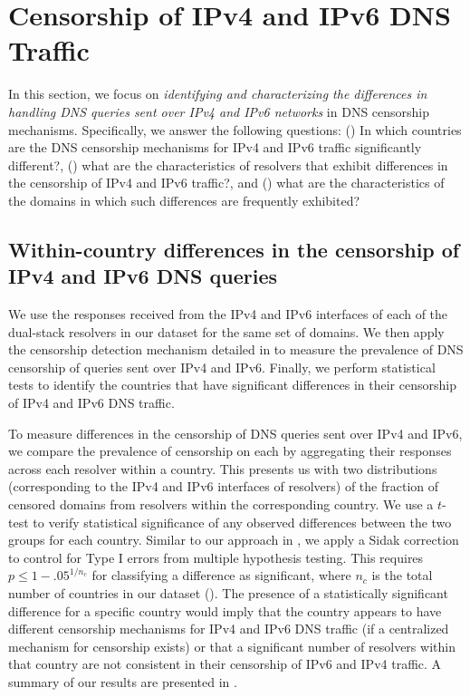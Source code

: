 \section{Censorship of IPv4 and IPv6 DNS Traffic}
\label{sec:infrastructure}

 In this section, we focus on {\it identifying and
characterizing the differences in handling DNS queries sent over IPv4 and IPv6
networks} in DNS censorship mechanisms. 
%
Specifically, we answer the following questions:
%
() In which countries are the DNS censorship
mechanisms for IPv4 and IPv6 traffic significantly different?,
%
() what are the characteristics of resolvers
that exhibit differences in the censorship of IPv4 and IPv6 traffic?, and
%
() what are the characteristics of the domains
in which such differences are frequently exhibited?

\subsection{Within-country differences in the censorship of IPv4 and IPv6 DNS
queries} \label{sec:infrastructure:country}

We use the responses received from the IPv4 and IPv6 interfaces of each of the
dual-stack resolvers in our dataset for the same set of domains. We then apply
the censorship detection mechanism detailed in  to
measure the prevalence of DNS censorship of queries sent over IPv4 and IPv6.
Finally, we perform statistical tests to identify the countries that have
significant differences in their censorship of IPv4 and IPv6 DNS traffic.

To measure differences in the censorship of DNS queries sent over IPv4 and
IPv6, we compare the prevalence of censorship on each by aggregating their
responses across each resolver within a country. This presents us with two
distributions (corresponding to the IPv4 and IPv6 interfaces of resolvers) of
the fraction of censored domains from resolvers within the corresponding
country.
%
We use a $t$-test to verify statistical significance of any observed
differences between the two groups for each country. Similar to our approach in
, we apply a Sidak correction to control for Type I errors
from multiple hypothesis testing. 
%
This requires $p \leq 1-{.05}^{1/n_{c}}$ for classifying a difference as
significant, where $n_c$ is the total number of countries in our dataset
(). 
%
The presence of a statistically significant difference for a specific country
would imply that the country appears to have different censorship mechanisms
for IPv4 and IPv6 DNS traffic (if a centralized mechanism for censorship
exists) or that a significant number of resolvers within that country are not
consistent in their censorship of IPv6 and IPv4 traffic.
%
A summary of our results are presented in .

